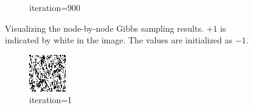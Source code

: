 \documentclass{article}
\begin{document}
\begin{figure}[h]
\begin{subfigure}[t]{0.18\textwidth}
\vspace{-0.6cm}
\caption{iteration=900}
\end{subfigure}\hspace{0.01\textwidth}
\caption{Visualizing the node-by-node Gibbs sampling results. $+1$ is indicated by white in the image. The values are initialized as $-1$.}
\label{f:63b}
\end{figure}
%
\pagebreak
%
\begin{figure}[h]
\captionsetup[subfigure]{labelformat=empty}
\centering
\begin{subfigure}[t]{0.18\textwidth}
\centering
\includegraphics[width=\textwidth]{./computational/results/gibbs_comb_sampler_positive_iter_0.png}
\vspace{-0.6cm}
\caption{iteration=1}
\end{subfigure}\hspace{0.01\textwidth}
\begin{subfigure}[t]{0.18\textwidth}
\centering

\end{subfigure}
\end{figure}
\end{document}
